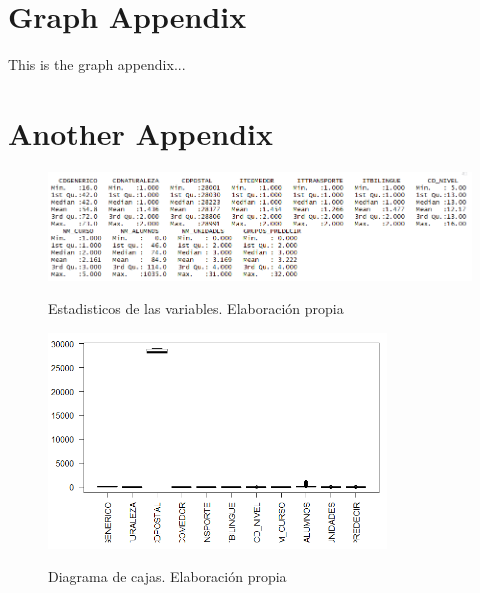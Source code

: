 \clearpage
\begin{appendices}
	\section{Graph Appendix}
	\label{appendix:graph}
	This is the graph appendix...
	
	\section{Another Appendix}
	
\end{appendices}

	\begin{figure}[htb]
	\centering
	\caption{Estadisticos de las variables. Elaboración propia}
	\includegraphics[width=1.2\textwidth]{recursos/ImagenesR/estadisticos}
	\label{fig:estadisticos}
\end{figure}
\FloatBarrier

	\begin{figure}[htb]
	\centering
	\caption{Diagrama de cajas. Elaboración propia}
	\includegraphics[width=0.8\textwidth]{recursos/ImagenesR/boxplot}
	\label{fig:boxplot}
\end{figure}
\FloatBarrier


